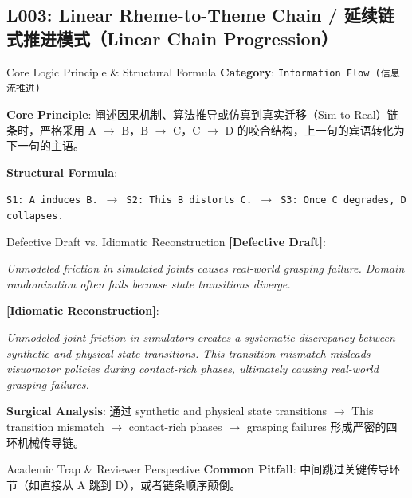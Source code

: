 \subsection{L003: Linear Rheme-to-Theme Chain / 延续链式推进模式（Linear Chain Progression）}\label{sec:logic:L003}
\begin{ConceptBox}{Core Logic Principle \& Structural Formula}
\textbf{Category}: \texttt{Information Flow (信息流推进)}\par\vspace{3pt}
\textbf{Core Principle}: 阐述因果机制、算法推导或仿真到真实迁移（Sim-to-Real）链条时，严格采用 A $\to$ B，B $\to$ C，C $\to$ D 的咬合结构，上一句的宾语转化为下一句的主语。\par\vspace{4pt}
\textbf{Structural Formula}:\par\noindent\texttt{S1: A induces B. $\to$ S2: This B distorts C. $\to$ S3: Once C degrades, D collapses.}
\end{ConceptBox}
\begin{ExampleBox}{Defective Draft vs. Idiomatic Reconstruction}
\textbf{\color{TargetHighlight}[Defective Draft]}:\par\textit{Unmodeled friction in simulated joints causes real-world grasping failure. Domain randomization often fails because state transitions diverge.}\par\vspace{4pt}
\textbf{\color{AcadNavy}[Idiomatic Reconstruction]}:\par\textit{Unmodeled joint friction in simulators creates a systematic discrepancy between synthetic and physical state transitions. This transition mismatch misleads visuomotor policies during contact-rich phases, ultimately causing real-world grasping failures.}\par\vspace{4pt}
\textbf{Surgical Analysis}: 通过 synthetic and physical state transitions $\to$ This transition mismatch $\to$ contact-rich phases $\to$ grasping failures 形成严密的四环机械传导链。
\end{ExampleBox}
\begin{TipBox}{Academic Trap \& Reviewer Perspective}
\textbf{Common Pitfall}: 中间跳过关键传导环节（如直接从 A 跳到 D），或者链条顺序颠倒。
\end{TipBox}
\vspace{6pt}
